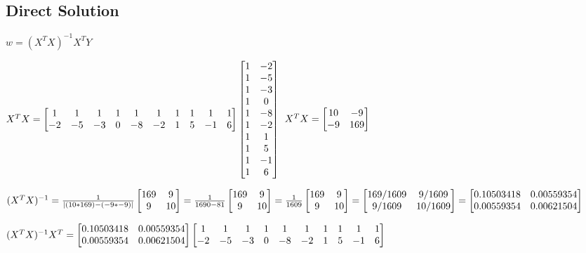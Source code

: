 \documentclass[12pt]{article}
\begin{document}
\newpage
\subsection{Direct Solution}
$w = (X^TX)^{-1}X^TY$

\noindent $X^TX = \begin{bmatrix}
	1 & 1 & 1 & 1 & 1 & 1 & 1 & 1 & 1 & 1\\
	-2 & -5 & -3 & 0 & -8 & -2 & 1 & 5 & -1 & 6
\end{bmatrix}
\begin{bmatrix}
	1 & -2\\
	1 & -5\\
	1 & -3\\
	1 & 0\\
	1 & -8\\
	1 & -2\\
	1 & 1\\
	1 & 5\\
	1 & -1\\
	1 & 6
\end{bmatrix}\\
$
$X^TX = 
\begin{bmatrix}
 10 & -9\\
-9 & 169\\
\end{bmatrix}\\
$
\hfill \break
\hfill \break

\noindent $(X^TX)^{-1} = 
\frac{1}{|(10*169)-(-9*-9)|}\begin{bmatrix}169 & 9\\ 9 & 10\end{bmatrix} = \frac{1}{1690-81}\begin{bmatrix}169 & 9\\ 9 & 10\end{bmatrix}=
\hfill \break
\frac{1}{1609}\begin{bmatrix}169 & 9\\ 9 & 10\end{bmatrix}=\begin{bmatrix}169/1609 & 9/1609\\ 9/1609 & 10/1609\end{bmatrix} = \begin{bmatrix}0.10503418 & 0.00559354\\ 0.00559354 & 0.00621504\end{bmatrix}\\
$

\hfill \break
\hfill \break
\noindent $(X^TX)^{-1}X^T = 
\begin{bmatrix}0.10503418 & 0.00559354\\ 0.00559354 & 0.00621504\end{bmatrix}
\begin{bmatrix}
1 & 1 & 1 & 1 & 1 & 1 & 1 & 1 & 1 & 1\\
-2 & -5 & -3 & 0 & -8 & -2 & 1 & 5 & -1 & 6
\end{bmatrix}\\
$
\hfill \break
\hfill \break
\end{document}
